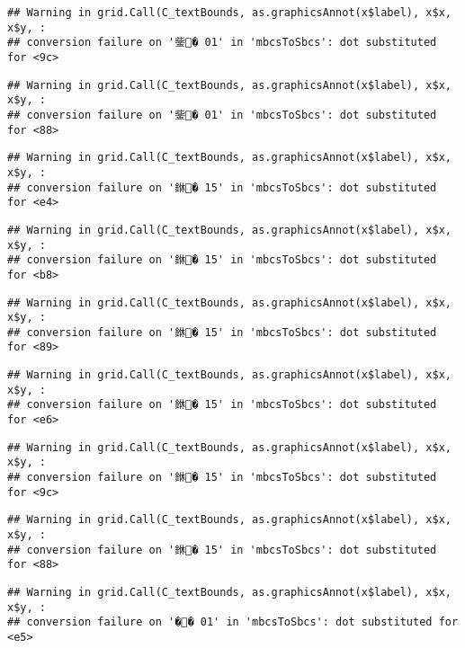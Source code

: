 \documentclass[]{article}
\begin{document}
\begin{verbatim}
## Warning in grid.Call(C_textBounds, as.graphicsAnnot(x$label), x$x, x$y, :
## conversion failure on '鈭� 01' in 'mbcsToSbcs': dot substituted for <9c>
\end{verbatim}

\begin{verbatim}
## Warning in grid.Call(C_textBounds, as.graphicsAnnot(x$label), x$x, x$y, :
## conversion failure on '鈭� 01' in 'mbcsToSbcs': dot substituted for <88>
\end{verbatim}

\begin{verbatim}
## Warning in grid.Call(C_textBounds, as.graphicsAnnot(x$label), x$x, x$y, :
## conversion failure on '銝� 15' in 'mbcsToSbcs': dot substituted for <e4>
\end{verbatim}

\begin{verbatim}
## Warning in grid.Call(C_textBounds, as.graphicsAnnot(x$label), x$x, x$y, :
## conversion failure on '銝� 15' in 'mbcsToSbcs': dot substituted for <b8>
\end{verbatim}

\begin{verbatim}
## Warning in grid.Call(C_textBounds, as.graphicsAnnot(x$label), x$x, x$y, :
## conversion failure on '銝� 15' in 'mbcsToSbcs': dot substituted for <89>
\end{verbatim}

\begin{verbatim}
## Warning in grid.Call(C_textBounds, as.graphicsAnnot(x$label), x$x, x$y, :
## conversion failure on '銝� 15' in 'mbcsToSbcs': dot substituted for <e6>
\end{verbatim}

\begin{verbatim}
## Warning in grid.Call(C_textBounds, as.graphicsAnnot(x$label), x$x, x$y, :
## conversion failure on '銝� 15' in 'mbcsToSbcs': dot substituted for <9c>
\end{verbatim}

\begin{verbatim}
## Warning in grid.Call(C_textBounds, as.graphicsAnnot(x$label), x$x, x$y, :
## conversion failure on '銝� 15' in 'mbcsToSbcs': dot substituted for <88>
\end{verbatim}

\begin{verbatim}
## Warning in grid.Call(C_textBounds, as.graphicsAnnot(x$label), x$x, x$y, :
## conversion failure on '�� 01' in 'mbcsToSbcs': dot substituted for <e5>
\end{verbatim}
\end{document}
